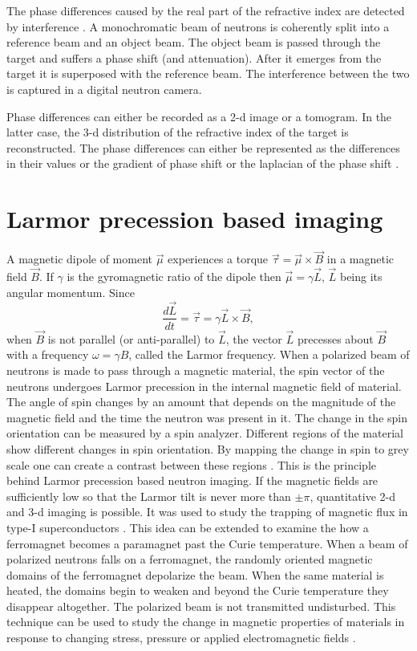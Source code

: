 \documentclass{article}
\numberwithin{equation}{section}
\begin{document}
The phase differences caused by the real part of the refractive index are
detected by interference \cite{zawisky2004neutron}. A monochromatic beam of
neutrons is coherently split into a reference beam and an object beam. The 
object beam is passed through the target and suffers a phase shift (and 
attenuation). After it emerges from the target it is superposed with the 
reference beam. The interference between the two is captured in a digital
neutron camera.

Phase differences can either be recorded as a 2-d image or a tomogram. In the
latter case, the 3-d distribution of the refractive index of the target is 
reconstructed. The phase differences can either be represented as the 
differences in their values or the gradient of phase shift or the laplacian of
the phase shift \cite{anderson2008neutron}.

\section{Larmor precession based imaging}\label{s11}
A magnetic dipole of moment $\vec{\mu}$ experiences a torque $\vec{\tau} = 
\vec{\mu} \times \vec{B}$ in a magnetic field $\vec{B}$. If $\gamma$ is the
gyromagnetic ratio of the dipole then $\vec{\mu} = \gamma\vec{L}$, $\vec{L}$
being its angular momentum. Since
\begin{equation}\label{s11e1}
\frac{d\vec{L}}{dt} = \vec{\tau} = \gamma\vec{L} \times \vec{B},
\end{equation}
when $\vec{B}$ is not parallel (or anti-parallel) to $\vec{L}$, the vector 
$\vec{L}$ precesses about $\vec{B}$ with a frequency $\omega = \gamma B$, 
called the Larmor frequency. When a polarized beam of neutrons is made to
pass through a magnetic material, the spin vector of the neutrons undergoes
Larmor precession in the internal magnetic field of material. The angle of 
spin changes by an amount that depends on the magnitude of the magnetic field
and the time the neutron was present in it. The change in the spin orientation
can be measured by a spin analyzer. Different regions of the material show
different changes in spin orientation. By mapping the change in spin to grey
scale one can create a contrast between these regions 
\cite{kardjilov2011neutron}. This is the principle behind Larmor precession
based neutron imaging. If the magnetic fields are sufficiently low so that
the Larmor tilt is never more than $\pm\pi$, quantitative 2-d and 3-d imaging
is possible. It was used to study the trapping of magnetic flux in type-I 
superconductors \cite{kardjilov2008three}. This idea can be extended to 
examine the how a ferromagnet becomes a paramagnet past the Curie temperature.
When a beam of polarized neutrons falls on a ferromagnet, the randomly oriented
magnetic domains of the ferromagnet depolarize the beam. When the same material
is heated, the domains begin to weaken and beyond the Curie temperature they
disappear altogether. The polarized beam is not transmitted undisturbed. This
technique can be used to study the change in magnetic properties of materials
in response to changing stress, pressure or applied electromagnetic fields
\cite{kardjilov2011neutron}.
\end{document}
